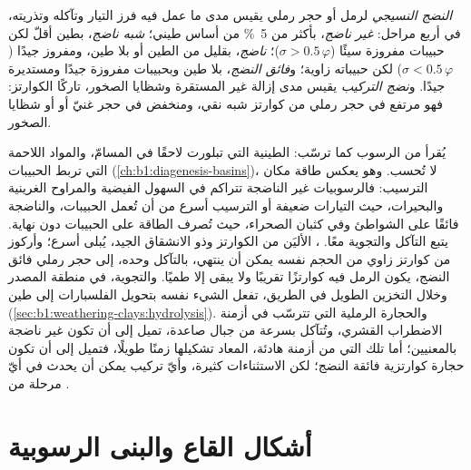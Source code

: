 \begin{definition}\label{def:b1:clastic-sediments:maturity}
\emph{النضج النسيجي} لرمل أو حجر رملي يقيس مدى ما عمل فيه فرز التيار وتآكله وتذريته، في أربع مراحل: \emph{غير ناضج}، بأكثر من \qty{5}{\percent} من أساس طيني؛ \emph{شبه ناضج}، بطين أقلّ لكن حبيبات مفروزة سيئًا ($\sigma > 0.5\,\varphi$)؛ \emph{ناضج}، بقليل من الطين أو بلا طين، ومفروز جيدًا ($\sigma < 0.5\,\varphi$) لكن حبيباته زاوية؛ و\emph{فائق النضج}، بلا طين وبحبيبات مفروزة جيدًا ومستديرة جيدًا. و\emph{نضج التركيب} يقيس مدى إزالة  غير المستقرة وشظايا الصخور، تاركًا الكوارتز: فهو مرتفع في حجر رملي من كوارتز شبه نقي، ومنخفض في حجر غنيّ  أو  أو شظايا الصخور.
\end{definition}

يُقرأ  من الرسوب كما ترسّب:  الطينية التي تبلورت لاحقًا في المسامّ، والمواد اللاحمة التي تربط الحبيبات (\cref{ch:b1:diagenesis-basins})، لا تُحسب. وهو يعكس طاقة مكان الترسيب: فالرسوبيات غير الناضجة تتراكم في السهول الفيضية والمراوح الغرينية والبحيرات، حيث التيارات ضعيفة أو الترسيب أسرع من أن تُعمل الحبيبات، والناضجة فائقًا على الشواطئ وفي كثبان الصحراء، حيث تُصرف الطاقة على الحبيبات دون نهاية.  يتبع التآكل والتجوية معًا. ، الأليَن من الكوارتز وذو الانشقاق الجيد، يُبلى أسرع؛ وأركوز من كوارتز زاوي  من الحجم نفسه يمكن أن ينتهي، بالتآكل وحده، إلى حجر رملي فائق النضج، يكون الرمل فيه كوارتزًا تقريبًا ولا يبقى  إلا طميًا. والتجوية، في منطقة المصدر وخلال التخزين الطويل في الطريق، تفعل الشيء نفسه بتحويل الفلسبارات إلى طين (\cref{sec:b1:weathering-clays:hydrolysis}). والحجارة الرملية التي تترسّب في أزمنة الاضطراب القشري، وتُتآكل بسرعة من جبال صاعدة، تميل إلى أن تكون غير ناضجة بالمعنيين؛ أما تلك التي من أزمنة هادئة، المعاد تشكيلها زمنًا طويلًا، فتميل إلى أن تكون حجارة كوارتزية فائقة النضج؛ لكن الاستثناءات كثيرة، وأيّ تركيب يمكن أن يحدث في أيّ مرحلة من .

\section{أشكال القاع والبنى الرسوبية}\label{sec:b1:clastic-sediments:bedforms}

